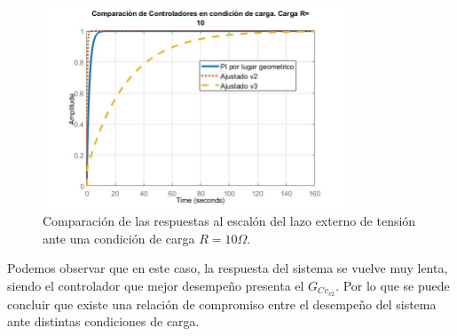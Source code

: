 \begin{figure} [H]
	\centering
	\includegraphics[width=0.8\textwidth]{./imagenes/Resp_lazo_tension_carga.jpg}
	\caption{Comparación de las respuestas al escalón del lazo externo de tensión ante una condición de carga $R=10\Omega$.}
	\label{F:Resp_lazo_tension_carga}
\end{figure} \par 
Podemos observar que en este caso, la respuesta del sistema se vuelve muy lenta, siendo el controlador que mejor desempeño presenta el $G_{Cv_{v2}}$. Por lo que se puede concluir que existe una relación de compromiso entre el desempeño del sistema ante distintas condiciones de carga. \par

